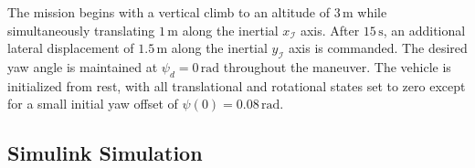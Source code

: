 \documentclass[conference]{IEEEtran}
\begin{document}
The mission begins with a vertical climb to an altitude of $3\,\mathrm{m}$ while simultaneously translating $1\,\mathrm{m}$ along the inertial $x_{\mathcal{I}}$ axis. After $15\,\mathrm{s}$, an additional lateral displacement of $1.5\,\mathrm{m}$ along the inertial $y_{\mathcal{I}}$ axis is commanded. The desired yaw angle is maintained at $\psi_d=0\,\mathrm{rad}$ throughout the maneuver. The vehicle is initialized from rest, with all translational and rotational states set to zero except for a small initial yaw offset of $\psi(0)=0.08\,\mathrm{rad}$.


\subsection{Simulink Simulation}
\end{document}
